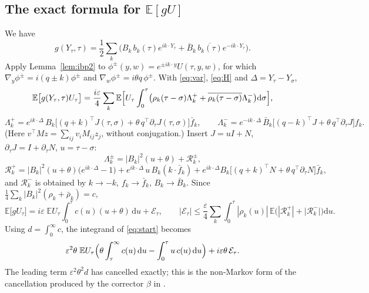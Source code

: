 \documentclass[11pt]{article}
\newcommand{\dd}{\mathrm{d}}
\newcommand{\E}{\mathbb{E}}
\newcommand{\eps}{\varepsilon}
\newcommand{\cR}{\mathcal{R}}
\newcommand{\cE}{\mathcal{E}}
\theoremstyle{remark}
\begin{document}
\subsection{The exact formula for $\E[gU]$}

We have
\[
  g(Y_\tau,\tau) = \frac12\sum_k\bigl(B_k\,b_k(\tau)e^{ik\cdot Y_\tau}
  +\bar B_k\,\overline{b_k(\tau)}e^{-ik\cdot Y_\tau}\bigr).
\]
Apply Lemma~\ref{lem:ibp2} to
$\phi^\pm(y,w) = e^{\pm ik\cdot y}U(\tau,y,w)$, for which
$\nabla_y\phi^\pm = i(q\pm k)\phi^\pm$ and
$\nabla_w\phi^\pm = i\theta q\,\phi^\pm$. With \eqref{eq:var}, \eqref{eq:H}
and $\Delta = Y_\tau-Y_\sigma$,
\begin{equation}
  \E\bigl[g(Y_\tau,\tau)U_\tau\bigr]
  = \frac{i\eps}{4}\sum_k\E\Bigl[U_\tau\int_0^\tau
     \bigl(\rho_k(\tau-\sigma)\Lambda_k^+
     + \overline{\rho_k(\tau-\sigma)}\Lambda_k^-\bigr)\dd\sigma\Bigr],
  \label{eq:exact}
\end{equation}
\[
  \Lambda_k^+ = e^{ik\cdot\Delta}\,B_k\bigl[(q+k)^{\!\top}J(\tau,\sigma)
     + \theta\,q^{\!\top}\partial_\tau J(\tau,\sigma)\bigr]\bar f_k,
  \qquad
  \Lambda_k^- = e^{-ik\cdot\Delta}\,\bar B_k\bigl[(q-k)^{\!\top}J
     + \theta\,q^{\!\top}\partial_\tau J\bigr]f_k .
\]
(Here $v^{\top}Mz = \sum_{ij}v_iM_{ij}z_j$, without conjugation.) Insert
$J = uI+N$, $\partial_\tau J = I+\partial_\tau N$, $u = \tau-\sigma$:
\begin{equation}
  \Lambda_k^\pm = |B_k|^2(u+\theta)+\cR_k^\pm,
  \label{eq:Lam}
\end{equation}
\[
  \cR_k^+ = |B_k|^2(u+\theta)\bigl(e^{ik\cdot\Delta}-1\bigr)
   + e^{ik\cdot\Delta}\,u\,B_k(k\cdot\bar f_k)
   + e^{ik\cdot\Delta}B_k\bigl[(q+k)^{\!\top}N+\theta\,q^{\!\top}\partial_\tau N\bigr]\bar f_k ,
\]
and $\cR_k^-$ is obtained by $k\to-k$, $f_k\to\bar f_k$, $B_k\to\bar B_k$.
Since $\frac14\sum_k|B_k|^2(\rho_k+\bar\rho_k) = c$,
\begin{equation}
  \E\bigl[gU_\tau\bigr]
  = i\eps\;\E U_\tau\int_0^\tau c(u)(u+\theta)\,\dd u+\cE_\tau,
  \qquad
  |\cE_\tau|\le\frac\eps4\sum_k\int_0^\tau|\rho_k(u)|\,
     \E\bigl(|\cR_k^+|+|\cR_k^-|\bigr)\dd u .
  \label{eq:split}
\end{equation}
Using $d = \int_0^\infty c$, the integrand of \eqref{eq:start} becomes
\begin{equation}
  \eps^2\theta\;\E U_\tau\Bigl(\theta\int_\tau^\infty c(u)\,\dd u
     - \int_0^\tau u\,c(u)\,\dd u\Bigr)+i\eps\theta\,\cE_\tau .
  \label{eq:integrand}
\end{equation}
The leading term $\eps^2\theta^2d$ has cancelled exactly; this is the
non-Markov form of the cancellation produced by the corrector $\beta$ in
\cite{Note}.
\end{document}
